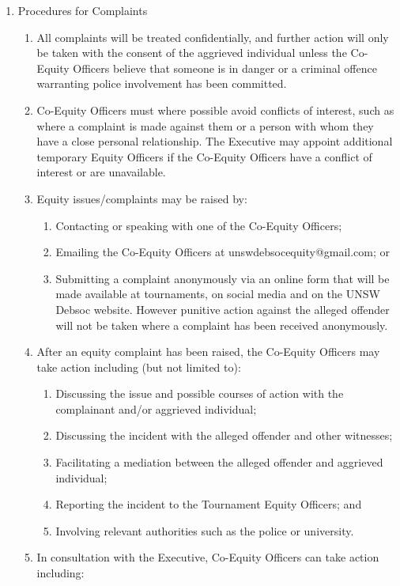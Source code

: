 \begin{enumerate}
\item Procedures for Complaints
  \begin{enumerate}
  \item All complaints will be treated confidentially, and further action will only be taken with the consent of the aggrieved individual unless the Co-Equity Officers believe that someone is in danger or a criminal offence warranting police involvement has been committed.
  \item Co-Equity Officers must where possible avoid conflicts of interest, such as where a complaint is made against them or a person with whom they have a close personal relationship. The Executive may appoint additional temporary Equity Officers if the Co-Equity Officers have a conflict of interest or are unavailable.
  \item Equity issues/complaints may be raised by:
    \begin{enumerate}
    \item Contacting or speaking with one of the Co-Equity Officers;
    \item Emailing the Co-Equity Officers at unswdebsocequity@gmail.com; or
    \item Submitting a complaint anonymously via an online form that will be made available at tournaments, on social media and on the UNSW Debsoc website. However punitive action against the alleged offender will not be taken where a complaint has been received anonymously.
    \end{enumerate}
  \item After an equity complaint has been raised, the Co-Equity Officers may take action including (but not limited to):
    \begin{enumerate}
    \item Discussing the issue and possible courses of action with the complainant and/or aggrieved individual;
    \item Discussing the incident with the alleged offender and other witnesses;
    \item Facilitating a mediation between the alleged offender and aggrieved individual;
    \item Reporting the incident to the Tournament Equity Officers; and
    \item Involving relevant authorities such as the police or university.
    \end{enumerate}
  \item In consultation with the Executive, Co-Equity Officers can take action including:

\end{enumerate}
\end{enumerate}

